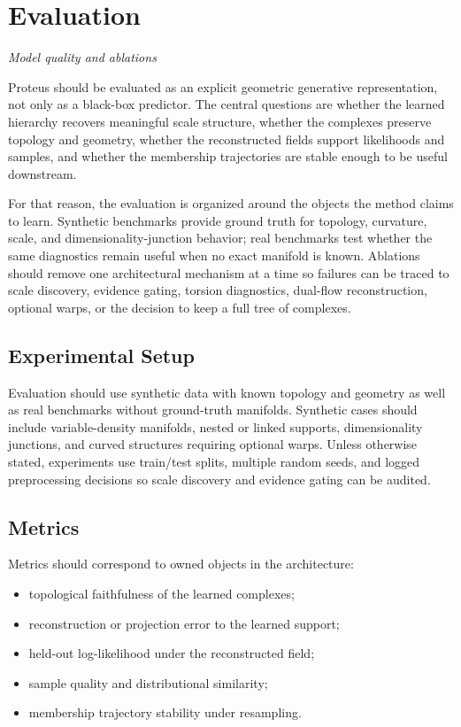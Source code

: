 \documentclass[11pt]{article}
\newcommand{\sectionsubtitle}[1]{\vspace{-0.25em}\noindent\textit{#1}\par\vspace{0.75em}}
\theoremstyle{definition}
\theoremstyle{plain}
\begin{document}
\section{Evaluation}
\label{sec:evaluation}
\sectionsubtitle{Model quality and ablations}

Proteus should be evaluated as an explicit geometric generative representation, not only as a black-box predictor. The central questions are whether the learned hierarchy recovers meaningful scale structure, whether the complexes preserve topology and geometry, whether the reconstructed fields support likelihoods and samples, and whether the membership trajectories are stable enough to be useful downstream.

For that reason, the evaluation is organized around the objects the method claims to learn. Synthetic benchmarks provide ground truth for topology, curvature, scale, and dimensionality-junction behavior; real benchmarks test whether the same diagnostics remain useful when no exact manifold is known. Ablations should remove one architectural mechanism at a time so failures can be traced to scale discovery, evidence gating, torsion diagnostics, dual-flow reconstruction, optional warps, or the decision to keep a full tree of complexes.

\subsection{Experimental Setup}
Evaluation should use synthetic data with known topology and geometry as well as real benchmarks without ground-truth manifolds. Synthetic cases should include variable-density manifolds, nested or linked supports, dimensionality junctions, and curved structures requiring optional warps. Unless otherwise stated, experiments use train/test splits, multiple random seeds, and logged preprocessing decisions so scale discovery and evidence gating can be audited.

\subsection{Metrics}
Metrics should correspond to owned objects in the architecture:
\begin{itemize}[leftmargin=1.5em]
  \item topological faithfulness of the learned complexes;
  \item reconstruction or projection error to the learned support;
  \item held-out log-likelihood under the reconstructed field;
  \item sample quality and distributional similarity;
  \item membership trajectory stability under resampling.
\end{itemize}
\end{document}
